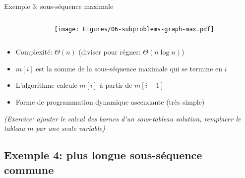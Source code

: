 \begin{frame}{Exemple 3: sous-séquence maximale}

\bigskip


\begin{columns}
\begin{column}{7cm}
\begin{center}
{\footnotesize
{}
}
\end{center}
\end{column}
\begin{column}{3cm}
\centerline{\texttt{[image: Figures/06-subproblems-graph-max.pdf]}}
\end{column}
\end{columns}

\bigskip

\begin{itemize}
\item Complexité: $\Theta(n)$ (diviser pour régner: $\Theta(n\log n)$)
\item $m[i]$ est la somme de la sous-séquence maximale qui se termine en $i$
\item L'algorithme calcule $m[i]$ à partir de $m[i-1]$
\item Forme de programmation dynamique ascendante (très simple)
\end{itemize}

{\it\small (Exercice: ajouter le calcul des bornes d'un sous-tableau solution, remplacer le tableau $m$ par une seule variable)}

\end{frame}

\subsection{Exemple 4: plus longue sous-séquence commune}

